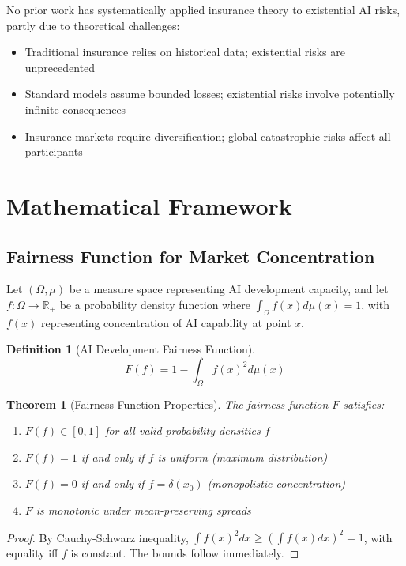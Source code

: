 \documentclass[11pt]{article}
\newtheorem{theorem}{Theorem}
\newtheorem{definition}{Definition}
\begin{document}
No prior work has systematically applied insurance theory to existential AI risks, partly due to theoretical challenges:
\begin{itemize}
   \item Traditional insurance relies on historical data; existential risks are unprecedented
   \item Standard models assume bounded losses; existential risks involve potentially infinite consequences  
   \item Insurance markets require diversification; global catastrophic risks affect all participants
\end{itemize}

\section{Mathematical Framework}

\subsection{Fairness Function for Market Concentration}

Let $(\Omega, \mu)$ be a measure space representing AI development capacity, and let $f: \Omega \to \mathbb{R}_+$ be a probability density function where $\int_\Omega f(x)d\mu(x) = 1$, with $f(x)$ representing concentration of AI capability at point $x$.

\begin{definition}[AI Development Fairness Function]
$$F(f) = 1 - \int_\Omega f(x)^2 d\mu(x)$$
\end{definition}

\begin{theorem}[Fairness Function Properties]
The fairness function $F$ satisfies:
\begin{enumerate}
   \item $F(f) \in [0,1]$ for all valid probability densities $f$
   \item $F(f) = 1$ if and only if $f$ is uniform (maximum distribution)
   \item $F(f) = 0$ if and only if $f = \delta(x_0)$ (monopolistic concentration)
   \item $F$ is monotonic under mean-preserving spreads
\end{enumerate}
\end{theorem}

\begin{proof}
By Cauchy-Schwarz inequality, $\int f(x)^2dx \geq (\int f(x)dx)^2 = 1$, with equality iff $f$ is constant. The bounds follow immediately.
\end{proof}
\end{document}
